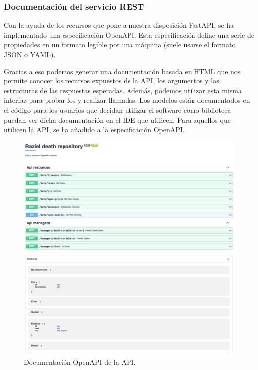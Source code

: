 \subsubsection{Documentación del servicio REST}
Con la ayuda de los recursos que pone a nuestra disposición FastAPI, se ha implementado
una especificación OpenAPI. Esta especificación define una serie de propiedades en un
formato legible por una máquina (suele usarse el formato JSON o YAML).

Gracias a eso podemos generar una documentación basada en HTML que nos permite conocer los
recursos expuestos de la API, los argumentos y las estructuras de las respuestas
esperadas. Además, podemos utilizar esta misma interfaz para probar los
 y realizar llamadas. Los modelos están documentados en el código para
los usuarios que decidan utilizar el software como biblioteca puedan ver dicha
documentación en el IDE que utilicen. Para aquellos que utilicen la API, se ha añadido a
la especificación OpenAPI.

\FloatBarrier
\begin{figure}[h]
	\centering	
	\includegraphics[width=\textwidth]{doc/logos/imgs/openapi.png}
	\caption{ Documentación OpenAPI de la API. }
    \label{fig:worst_f_value}
\end{figure}
\FloatBarrier

